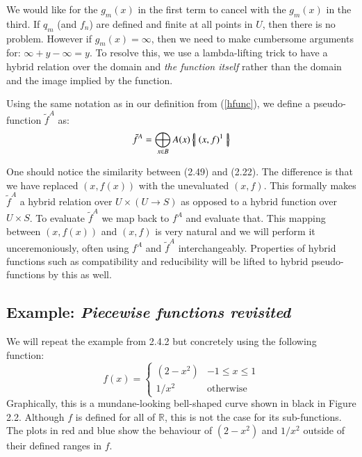 We would like for the $g_m(x)$ in the first term to cancel with the $g_m(x)$ in the third.
If $q_m$ (and $f_n$) are defined and finite at all points in $U$, then there is no problem.
However if $g_m(x)=\infty$, then we need to make cumbersome arguments for: $ \infty + y - \infty = y$.
To resolve this, we use a lambda-lifting trick to have a hybrid relation over the domain and \emph{the function itself}
rather than the domain and the image implied by the function.


\begin{definition}
	Using the same notation as in our definition from (\ref{hfunc}), we define a pseudo-function $\tilde{f}^A$ as:
	\begin{equation}
 		\tilde{f}^A = \bigoplus_{x \in B} A(x) \left\{ \! \left| \; (x,f)^1 \; \right| \! \right\}
	\end{equation}
\end{definition}


One should notice the similarity between (2.49) and (2.22).
The difference is that we have replaced $(x, f(x))$ with the unevaluated $(x,f)$.
This formally makes $\tilde{f}^A$ a hybrid relation over $U \times (U \to S)$ as opposed to 
a hybrid function over $U \times S$.
To evaluate $\tilde{f}^A$ we map back to $f^A$ and evaluate that.
This mapping between $(x,f(x))$ and $(x,f)$ is very natural and we will perform it unceremoniously,
often using $f^A$ and $\tilde{f}^A$ interchangeably. 
Properties of hybrid functions such as compatibility and reducibility will be lifted to hybrid pseudo-functions by this as well.


\subsection{Example: \emph{Piecewise functions revisited}}


We will repeat the example from 2.4.2 but concretely using the following function:
\begin{equation}
	f(x) = \begin{cases}
		(2-x^2) & -1 \leq x \leq 1\\
		1/x^2 & \text{otherwise}
	\end{cases}
\end{equation}
Graphically, this is a mundane-looking bell-shaped curve shown in black in Figure 2.2.
Although $f$ is defined for all of $\mathbb{R}$, this is not the case for its sub-functions. 
The plots in red and blue show the behaviour of $(2-x^2)$ and $1/x^2$ outside of their defined ranges in $f$.


